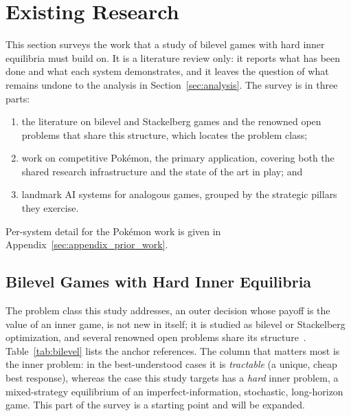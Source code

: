 
\section{Existing Research}
\label{sec:existing_research}

This section surveys the work that a study of bilevel games with hard inner
equilibria must build on. It is a literature review only: it reports what has been
done and what each system demonstrates, and it leaves the question of what remains
undone to the analysis in Section~\ref{sec:analysis}. The survey is in three
parts:

\begin{enumerate}
  \item the literature on bilevel and Stackelberg games and the renowned open
        problems that share this structure, which locates the problem class;
  \item work on competitive Pok\'{e}mon, the primary application, covering both
        the shared research infrastructure and the state of the art in play; and
  \item landmark AI systems for analogous games, grouped by the strategic pillars
        they exercise.
\end{enumerate}

Per-system detail for the Pok\'{e}mon work is given in
Appendix~\ref{sec:appendix_prior_work}.

\clearpage
\subsection{Bilevel Games with Hard Inner Equilibria}
\label{subsec:bilevel_lit}

The problem class this study addresses, an outer decision whose payoff is the
value of an inner game, is not new in itself; it is studied as bilevel or
Stackelberg optimization, and several renowned open problems share its
structure~\cite{zhang2023bilevel}. Table~\ref{tab:bilevel} lists the anchor
references. The column that matters most is the inner problem: in the
best-understood cases it is \emph{tractable} (a unique, cheap best response),
whereas the case this study targets has a \emph{hard} inner problem, a
mixed-strategy equilibrium of an imperfect-information, stochastic, long-horizon
game. This part of the survey is a starting point and will be expanded.

